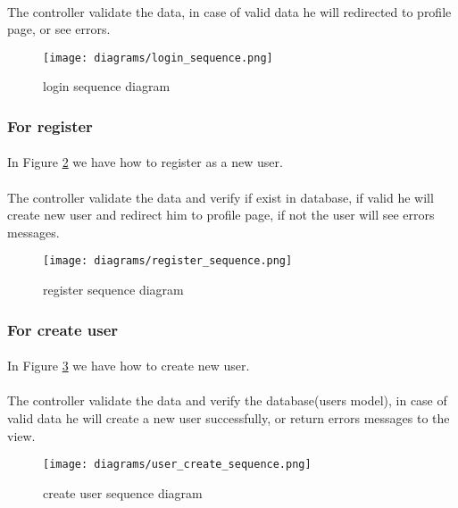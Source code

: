 	\paragraph{}
	The controller validate the data, in case of valid data he will redirected to profile page, or see errors.
	
		\begin{figure}[!ht]
			\centering
			\texttt{[image: diagrams/login\_sequence.png]}
			\caption{login sequence diagram}
			\label{fig:login-s-d}
		\end{figure}
	
	\subsubsection{For register}
	\paragraph{}
	In Figure \ref{fig:register-s-d} we have how to register as a new user.
	\paragraph{}
	The controller validate the data and verify if exist in database, if valid he will create new user and redirect him to profile page, if not the user will see errors messages.
	
		\begin{figure}[!ht]
			\centering
			\texttt{[image: diagrams/register\_sequence.png]}
			\caption{register sequence diagram}
			\label{fig:register-s-d}
		\end{figure}
	
	\subsubsection{For create user}
	\paragraph{}
	In Figure \ref{fig:user-create-s-d} we have how to create new user.
	\paragraph{}
	The controller validate the data and verify the database(users model), in case of valid data he will create a new user successfully, or return errors messages to the view.
	
		\begin{figure}[!ht]
			\centering
			\texttt{[image: diagrams/user\_create\_sequence.png]}
			\caption{create user sequence diagram}
			\label{fig:user-create-s-d}
		\end{figure}
	
